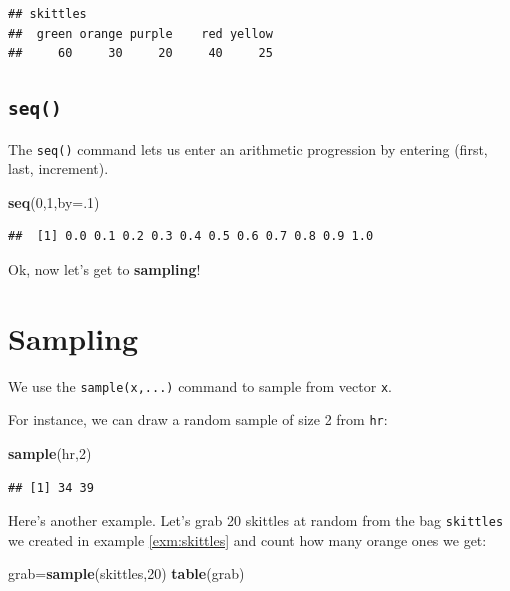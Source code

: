 \documentclass[
]{book}
\newenvironment{Shaded}{\begin{snugshade}}{\end{snugshade}}
\newcommand{\AttributeTok}[1]{\textcolor[rgb]{0.13,0.29,0.53}{#1}}
\newcommand{\DecValTok}[1]{\textcolor[rgb]{0.00,0.00,0.81}{#1}}
\newcommand{\FunctionTok}[1]{\textcolor[rgb]{0.13,0.29,0.53}{\textbf{#1}}}
\newcommand{\NormalTok}[1]{#1}
\newcommand{\OtherTok}[1]{\textcolor[rgb]{0.56,0.35,0.01}{#1}}
\theoremstyle{definition}
\theoremstyle{definition}
\theoremstyle{definition}
\theoremstyle{definition}
\theoremstyle{remark}
\begin{document}
\begin{verbatim}
## skittles
##  green orange purple    red yellow 
##     60     30     20     40     25
\end{verbatim}

\subsection{\texorpdfstring{\texttt{seq()}}{seq()}}\label{seq}

The \texttt{seq()} command lets us enter an arithmetic progression by entering (first, last, increment).

\begin{Shaded}
\begin{Highlighting}[]
\FunctionTok{seq}\NormalTok{(}\DecValTok{0}\NormalTok{,}\DecValTok{1}\NormalTok{,}\AttributeTok{by=}\NormalTok{.}\DecValTok{1}\NormalTok{)}
\end{Highlighting}
\end{Shaded}

\begin{verbatim}
##  [1] 0.0 0.1 0.2 0.3 0.4 0.5 0.6 0.7 0.8 0.9 1.0
\end{verbatim}

Ok, now let's get to \textbf{sampling}!

\section{Sampling}\label{sampling-in-R}

We use the \texttt{sample(x,...)} command to sample from vector \texttt{x}.

For instance, we can draw a random sample of size 2 from \texttt{hr}:

\begin{Shaded}
\begin{Highlighting}[]
\FunctionTok{sample}\NormalTok{(hr,}\DecValTok{2}\NormalTok{)}
\end{Highlighting}
\end{Shaded}

\begin{verbatim}
## [1] 34 39
\end{verbatim}

Here's another example. Let's grab 20 skittles at random from the bag \texttt{skittles} we created in example \ref{exm:skittles} and count how many orange ones we get:

\begin{Shaded}
\begin{Highlighting}[]
\NormalTok{grab}\OtherTok{=}\FunctionTok{sample}\NormalTok{(skittles,}\DecValTok{20}\NormalTok{)}
\FunctionTok{table}\NormalTok{(grab)}
\end{Highlighting}
\end{Shaded}
\end{document}
